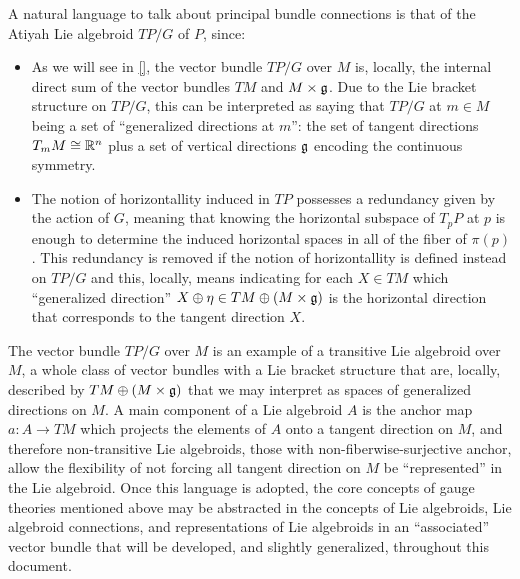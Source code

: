 A natural language to talk about principal bundle connections is that of the Atiyah Lie algebroid $TP/G$ of $P$, since:
    \begin{itemize}

    
    \item As we will see in \ref{}, the vector bundle $TP/G$ over $M$ is, locally, the internal direct sum of the vector bundles $TM$ and $M\times \mathfrak{g}$. Due to the Lie bracket structure on $TP/G$, this can be interpreted as saying that $TP/G$ at $m \in M$ being a set of ``generalized directions at $m$'': the set of tangent directions $T_m M \cong \mathbb{R}^n$ plus a set of vertical directions $\mathfrak{g}$ encoding the continuous symmetry.
    
    \item The notion of horizontallity induced in $TP$  %
    possesses a redundancy given by the action of $G$, meaning that knowing the horizontal subspace of $T_p P$ at $p$ is enough to determine the induced horizontal spaces in all of the fiber of $\pi(p)$. This redundancy is removed if the notion of horizontallity is defined instead on $TP/G$ and this, locally, means indicating for each $X \in TM$ which ``generalized direction'' $X \oplus \eta \in TM \oplus (M \times \mathfrak{g})$ is the horizontal direction that corresponds to the tangent direction $X$.
        
    \end{itemize}
The vector bundle $TP/G$ over $M$ is an example of a transitive Lie algebroid over $M$, a whole class of vector bundles with a Lie bracket structure that are, locally, described by $TM \oplus (M \times \mathfrak{g})$ that we may interpret as spaces of generalized directions on $M$. 
A main component of a Lie algebroid $A$ is the anchor map $a : A \to TM$ which projects the elements of $A$ onto a tangent direction on $M$, and therefore non-transitive Lie algebroids, those with non-fiberwise-surjective anchor, allow the flexibility of not forcing all tangent direction on $M$ be ``represented'' in the Lie algebroid. Once this language is adopted, the core concepts of gauge theories mentioned above may be abstracted in the concepts of Lie algebroids, Lie algebroid connections, and representations of Lie algebroids in an ``associated'' vector bundle that will be developed, and slightly generalized, throughout this document.

